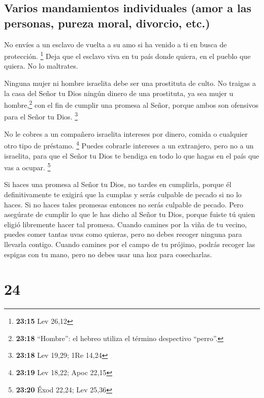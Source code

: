 \hypertarget{varios-mandamientos-individuales-amor-a-las-personas-pureza-moral-divorcio-etc.}{%
\subsection{Varios mandamientos individuales (amor a las personas,
pureza moral, divorcio,
etc.)}\label{varios-mandamientos-individuales-amor-a-las-personas-pureza-moral-divorcio-etc.}}

 No envíes a un esclavo de vuelta a su amo si ha venido a
ti en busca de protección. \footnote{\textbf{23:15} Lev 26,12}
 Deja que el esclavo viva en tu país donde quiera, en el
pueblo que quiera. No lo maltrates.

 Ninguna mujer ni hombre israelita debe ser una
prostituta de culto.  No traigas a la casa del Señor tu
Dios ningún dinero de una prostituta, ya sea mujer u hombre,\footnote{\textbf{23:18}
  ``Hombre'': el hebreo utiliza el término despectivo ``perro''.} con el
fin de cumplir una promesa al Señor, porque ambos son ofensivos para el
Señor tu Dios. \footnote{\textbf{23:18} Lev 19,29; 1Re 14,24}

 No le cobres a un compañero israelita intereses por
dinero, comida o cualquier otro tipo de préstamo. \footnote{\textbf{23:19}
  Lev 18,22; Apoc 22,15}  Puedes cobrarle intereses a un
extranjero, pero no a un israelita, para que el Señor tu Dios te bendiga
en todo lo que hagas en el país que vas a ocupar. \footnote{\textbf{23:20}
  Éxod 22,24; Lev 25,36}

 Si haces una promesa al Señor tu Dios, no tardes en
cumplirla, porque él definitivamente te exigirá que la cumplas y serás
culpable de pecado si no lo haces.  Si no haces tales
promesas entonces no serás culpable de pecado.  Pero
asegúrate de cumplir lo que le has dicho al Señor tu Dios, porque fuiste
tú quien eligió libremente hacer tal promesa.  Cuando
camines por la viña de tu vecino, puedes comer tantas uvas como quieras,
pero no debes recoger ninguna para llevarla contigo. 
Cuando camines por el campo de tu prójimo, podrás recoger las espigas
con tu mano, pero no debes usar una hoz para cosecharlas.

\hypertarget{section-23}{%
\section{24}\label{section-23}}


